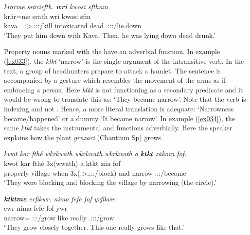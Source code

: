 \begin{exe}
	\ex \emph{krärme srärirfth. \textbf{wri} kwosi sfthnm.}\\
	\gll krär=me sräth wri kwosi sfm\\
	kava=\Ins{} \Stpl:\Sbj>\Tsg.\Masc:\Obj:\Irr:\Pfv/kill intoxicated dead \Tsg{}.\Masc:\Sbj:\Pst:\Dur/lie.down\\
	\trans `They put him down with Kava. Then, he was lying down dead drunk.'\\
	\label{ex042}
\end{exe}

Property nouns marked with the   have an adverbial function. In example (\ref{ex033}), the  \emph{ktkt} `narrow' is the single argument of the intransitive verb. In the text, a group of headhunters prepare to attack a hamlet. The sentence is accompanied by a gesture which resembles the movement of the arms as if embracing a person. Here \emph{ktkt} is not functioning as a secondary predicate and it would be wrong to translate this as: `They became narrow'. Note that the verb is indexing \Stsg{} and not \Stnsg{}. Hence, a more literal translation is adequate: `Narrowness became/happened' or a dummy  `It became narrow'. In example (\ref{ex034}), the same  \emph{ktkt} takes the instrumental  and functions adverbially. Here the speaker explains how the plant \emph{grnzari} (Chantium Sp) grows.

\begin{exe}
	\ex \emph{kwot kar fthé wkrkwath wkrkwath wkrkwath a \textbf{ktkt} zäkora fof.}\\
	\gll kwot kar fthé 3x(wwath) a {ktkt} zäa fof\\
	properly village when 3x(\Stpl:\Sbj>\Tsg.\F:\Obj:\Pst:\Ipfv/block) and narrow \Stsg:\Sbj:\Pst:\Pfv/become \Emph{}\\
	\trans `They were blocking and blocking the village by narrowing (the circle).'\\
	\label{ex033}
\end{exe}
\begin{exe}
	\ex \emph{\textbf{ktktme} erfikwr. nima fefe fof yrfikwr.}\\
	 ewr nima fefe fof ywr\\
	narrow=\Ins{} \Stpl:\Sbj:\Nonpast:\Ipfv/grow like really \Emph{} \Tsg.\Masc:\Sbj:\Nonpast:\Ipfv/grow\\
	\trans `They grow closely together. This one really grows like that.'\\
	\label{ex034}
\end{exe}

